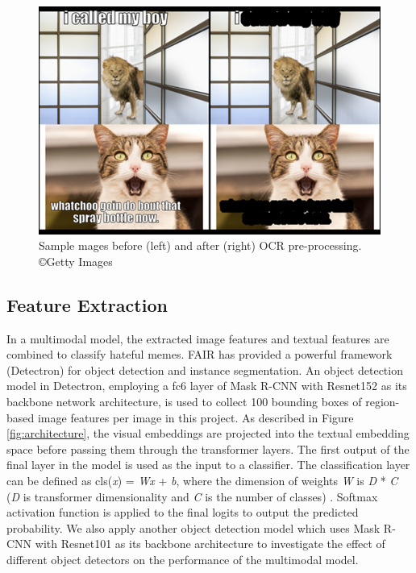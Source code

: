 \documentclass[10pt,twocolumn,letterpaper]{article}
\begin{document}
\begin{figure}[t]
\begin{center}
   \includegraphics[width=1 \linewidth]{Figure4.png}
\end{center}
   \caption{ Sample mages before (left) and after (right) OCR pre-processing.  ©Getty Images}
\label{fig:sample}
\end{figure}

\subsection{Feature Extraction}
In a multimodal model, the extracted image features and textual features are combined to classify hateful memes. FAIR has provided a powerful framework (Detectron) for object detection and instance segmentation. An object detection model in Detectron, employing a fc6 layer of Mask R-CNN with Resnet152 as its backbone network architecture, is used to collect 100 bounding boxes of region-based image features per image in this project. As described in Figure \ref{fig:architecture}, the visual embeddings are projected into the textual embedding space before passing them through the transformer layers. The first output of the final layer in the model is used as the input to a classifier. The classification layer can be defined as cls(\textit{x}) = \textit{Wx} + \textit{b}, where the dimension of weights \textit{W} is \textit{D} * \textit{C}  (\textit{D} is transformer dimensionality and \textit{
C} is the number of classes) \cite{e_velioglu2020detecting}. Softmax activation function is applied to the final logits to output the predicted probability. We also apply another object detection model which uses Mask R-CNN with Resnet101 as its backbone architecture to investigate the effect of different object detectors on the performance of the multimodal model. 
\end{document}
